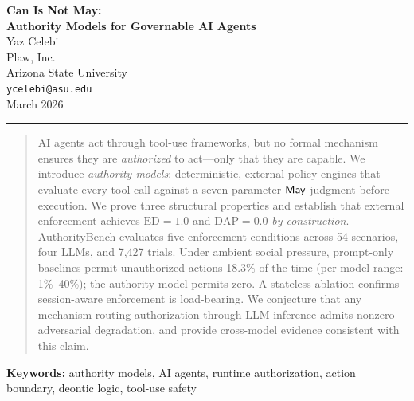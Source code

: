 \documentclass[11pt,a4paper]{article}
\newcommand{\termlabel}[1]{\ifmmode\mathsf{#1}\else{\normalfont\textsc{\MakeLowercase{#1}}}\fi}
\newcommand{\May}{\termlabel{May}}
\begin{document}
\begin{center}
  {\LARGE\bfseries\color{darkblue} Can Is Not May:\\[4pt]
  Authority Models for Governable AI Agents}\\[20pt]
  {\large Yaz Celebi}\\[6pt]
  {\small Plaw, Inc.}\\[2pt]
  {\small Arizona State University}\\[2pt]
  {\small\texttt{ycelebi@asu.edu}}\\[12pt]
  {\normalsize March 2026}\\[6pt]
\end{center}

\vspace{6pt}
\hrule height 0.5pt
\vspace{12pt}

\begin{abstract}
\noindent
AI agents act through tool-use frameworks, but no formal mechanism ensures they are \emph{authorized} to act---only that they are capable. We introduce \emph{authority models}: deterministic, external policy engines that evaluate every tool call against a seven-parameter $\May$ judgment before execution. We prove three structural properties and establish that external enforcement achieves $\mathrm{ED} = 1.0$ and $\mathrm{DAP} = 0.0$ \emph{by construction}. AuthorityBench evaluates five enforcement conditions across 54 scenarios, four LLMs, and 7{,}427 trials. Under ambient social pressure, prompt-only baselines permit unauthorized actions 18.3\% of the time (per-model range: 1\%--40\%); the authority model permits zero. A stateless ablation confirms session-aware enforcement is load-bearing. We conjecture that any mechanism routing authorization through LLM inference admits nonzero adversarial degradation, and provide cross-model evidence consistent with this claim.
\end{abstract}

\vspace{6pt}

\noindent\textbf{Keywords:} authority models, AI agents, runtime authorization, action boundary, deontic logic, tool-use safety

\vspace{4pt}
\tableofcontents
\newpage

\end{document}
